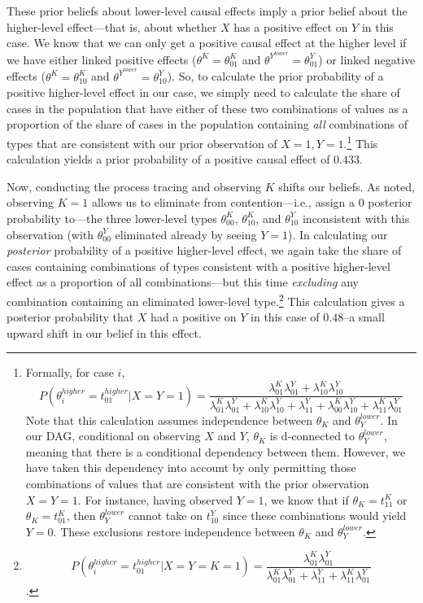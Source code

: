 \documentclass[12pt,]{book}
\let\rmarkdownfootnote\footnote%
\def\footnote{\protect\rmarkdownfootnote}
\begin{document}
These prior beliefs about lower-level causal effects imply a prior belief about the higher-level effect---that is, about whether \(X\) has a positive effect on \(Y\) in this case. We know that we can only get a positive causal effect at the higher level if we have either linked positive effects (\(\theta^K=\theta_{01}^{K}\) and \(\theta^{Y^{lower}}=\theta_{01}^{Y}\)) or linked negative effects (\(\theta^K=\theta_{10}^{K}\) and \(\theta^{Y^{lower}}=\theta_{10}^{Y}\)). So, to calculate the prior probability of a positive higher-level effect in our case, we simply need to calculate the share of cases in the population that have either of these two combinations of values as a proportion of the share of cases in the population containing \emph{all} combinations of types that are consistent with our prior observation of \(X=1, Y=1\).\footnote{Formally, for case \(i\), \[P(\theta_i^{higher} = t^{higher}_{01}| X=Y=1 ) = \frac{\lambda_{01}^{K}\lambda_{01}^{Y} + \lambda_{10}^{K}\lambda_{10}^{Y}}
   {\lambda_{01}^{K}\lambda_{01}^{Y} + \lambda_{10}^{K}\lambda_{10}^{Y}  +\lambda_{11}^{Y} + \lambda_{00}^{K}\lambda_{10}^{Y} + \lambda_{11}^{K}\lambda_{01}^{Y}}\] Note that this calculation assumes independence between \(\theta_K\) and \(\theta_Y^{lower}\). In our DAG, conditional on observing \(X\) and \(Y\), \(\theta_K\) is d-connected to \(\theta_Y^{lower}\), meaning that there is a conditional dependency between them. However, we have taken this dependency into account by only permitting those combinations of values that are consistent with the prior observation \(X=Y=1\). For instance, having observed \(Y=1\), we know that if \(\theta_K=t^K_11\) or \(\theta_K=t^K_01\), then \(\theta_Y^{lower}\) cannot take on \(t^Y_{10}\) since these combinations would yield \(Y=0\). These exclusions restore independence between \(\theta_K\) and \(\theta_Y^{lower}\).} This calculation yields a prior probability of a positive causal effect of \(0.433\).

Now, conducting the process tracing and observing \(K\) shifts our beliefs. As noted, observing \(K=1\) allows us to eliminate from contention---i.e., assign a 0 posterior probability to---the three lower-level types \(\theta_{00}^{K}\), \(\theta_{10}^{K}\), and \(\theta_{10}^{Y}\) inconsistent with this observation (with \(\theta_{00}^{Y}\) eliminated already by seeing \(Y=1\)). In calculating our \emph{posterior} probability of a positive higher-level effect, we again take the share of cases containing combinations of types consistent with a positive higher-level effect as a proportion of all combinations---but this time \emph{excluding} any combination containing an eliminated lower-level type.\footnote{\[P(\theta_i^{higher} = t^{higher}_{01}| X=Y=K=1 ) = \frac{\lambda_{01}^{K}\lambda_{01}^{Y}}
   {\lambda_{01}^{K}\lambda_{01}^{Y} + \lambda_{11}^{Y} + \lambda_{11}^{K}\lambda_{01}^{Y}}\].} This calculation gives a posterior probability that \(X\) had a positive on \(Y\) in this case of \(0.48\)--a small upward shift in our belief in this effect.
\end{document}
